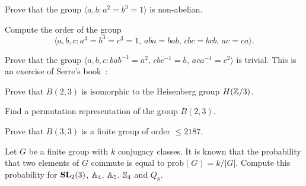 \begin{prob}
Prove that the group $\langle a,b:a^2=b^3=1\rangle$ is non-abelian.
\end{prob}

\begin{prob}
\label{prob:order=648}
Compute the order of the group
\[
  \langle a,b,c:a^3=b^3=c^3=1,\,aba=bab,\,cbc=bcb,\,ac=ca\rangle.
\]
\end{prob}

\begin{prob}
	\label{prob:Serre}
	Prove that the group $\langle a,b,c:bab^{-1}=a^{2},\,cbc^{-1}=b^{},\,
	aca^{-1}=c^{2}\rangle$ is trivial. This is an exercise of Serre's
	book~\cite[\S1]{MR1954121}:
\end{prob}

\begin{prob}
  \label{prob:B23}
  Prove that $B(2,3)$ is isomorphic to the Heisenberg group $H(\mathbb{Z}/3)$.
\end{prob}

\begin{prob}
	\label{prob:B23perm}
	Find a permutation representation of the group $B(2,3)$. 
\end{prob}

\begin{prob}
	\label{prob:B33}
	Prove that 
	$B(3,3)$ %
	is a finite group of order $\leq2187$. 
\end{prob}

\begin{prob}
	\label{prob:probability}
	Let $G$ be a finite group with $k$ conjugacy classes.  It is known that the
	probability that two elements of $G$ commute is equal to
	$\mathrm{prob}(G)=k/|G|$. Compute this probability for $\mathbf{SL}_2(3)$,
	$\mathbb{A}_4$, $\mathbb{A}_5$, $\mathbb{S}_4$ and $Q_8$.
\end{prob}


